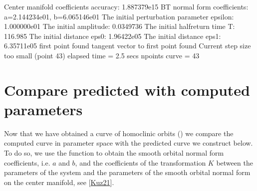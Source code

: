 \documentclass[letterpaper,10pt,english]{jupyterBook}
\begin{document}
\begin{sphinxVerbatim}[commandchars=\\\{\}]
\PYG{p}{[}\PYG{p}{]}
\PYG{p}{[}\PYG{p}{]}
\end{sphinxVerbatim}

\begin{sphinxVerbatim}[commandchars=\\\{\}]
Center manifold coefficients\PYGZsq{} accuracy: 1.887379e\PYGZhy{}15
BT normal form coefficients:
a=2.144234e\PYGZhy{}01,	 b=6.065146e\PYGZhy{}01
The initial perturbation parameter epsilon:  1.000000e\PYGZhy{}01
The initial amplitude: 0.0349736
The initial half\PYGZhy{}return time T: 116.985
The initial distance eps0: 1.96422e\PYGZhy{}05
The initial distance eps1: 6.35711e\PYGZhy{}05
first point found
tangent vector to first point found
Current step size too small (point 43)
elapsed time  = 2.5 secs
npoints curve = 43
\end{sphinxVerbatim}


\section{Compare predicted with computed parameters}
\label{\detokenize{extendedLorenz84model:compare-predicted-with-computed-parameters}}
\sphinxAtStartPar
Now that we have obtained a curve of homoclinic orbits () we
compare the computed curve in parameter space with the predicted curve we
construct below. To do so, we use the function  to obtain the
smooth orbital normal form coefficients, i.e. \(a\) and \(b\), and the coefficients
of the transformation \(K\) between the parameters of the system and the parameters
of the smooth orbital normal form on the center manifold, see
{[}\hyperlink{cite.references:id3}{Kuz21}{]}.
\end{document}
